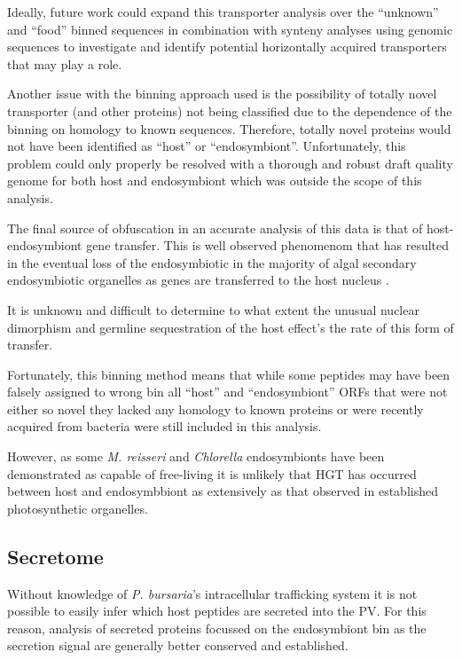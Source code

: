 Ideally, future work could expand this transporter analysis over the 
``unknown'' and ``food'' binned sequences in combination with synteny
analyses using genomic sequences to investigate and identify
potential horizontally acquired transporters that may play a role.

Another issue with the binning approach used is the possibility
of totally novel transporter (and other proteins) not being classified
due to the dependence of the binning on homology to known sequences.
Therefore, totally novel proteins would not have been identified as 
``host'' or ``endosymbiont''.  Unfortunately, this problem 
could only properly be resolved with a thorough and robust 
draft quality genome for both host and endosymbiont which was outside
the scope of this analysis. 

The final source of obfuscation in an accurate analysis of this data
is that of host-endosymbiont gene transfer.  
This is well observed phenomenom that has resulted in the eventual loss
of the endosymbiotic in the majority of algal secondary endosymbiotic organelles
as genes are transferred to the host nucleus
\citep{Keeling2008a,Archibald2005,Keeling2004}.

It is unknown and difficult to determine to what extent the 
unusual nuclear dimorphism and germline sequestration of the host 
effect's the rate of this form of transfer. 

Fortunately, this binning method means that while some peptides
may have been falsely assigned to wrong bin all ``host'' and
``endosymbiont'' ORFs that were not either so novel they lacked
any homology to known proteins or were recently acquired from
bacteria were still included in this analysis. 

However, as some \textit{M. reisseri} and \textit{Chlorella} endosymbionts 
have been demonstrated as capable of free-living it is unlikely
that HGT has occurred between host and endosymbbiont as extensively
as that observed in established photosynthetic organelles. 


\subsection{Secretome}
Without knowledge of \textit{P. bursaria}'s intracellular trafficking
system it is not possible to easily infer which host peptides are secreted into
the PV.  For this reason, analysis of secreted proteins focussed on 
the endosymbiont bin as the secretion signal are generally better conserved
and established. 


